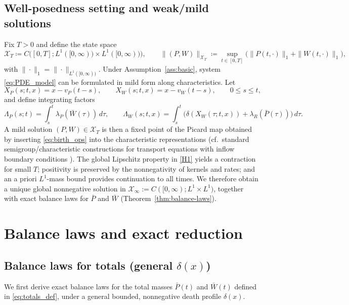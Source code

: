 \documentclass[pdflatex,sn-mathphys-ay]{sn-jnl}
\theoremstyle{thmstyleone}
\theoremstyle{definition}
\theoremstyle{remark}
\begin{document}
\subsection{Well-posedness setting and weak/mild solutions}
\label{subsec:wellposedness_setting}
Fix $T>0$ and define the state space
\begin{equation}\label{eq:XT_def}
\mathcal X_T \coloneqq C\!\big([0,T];L^1([0,\infty))\times L^1([0,\infty))\big),
\qquad
\|(P,W)\|_{\mathcal X_T} \coloneqq \sup_{t\in[0,T]}\big(\|P(t,\cdot)\|_1+\|W(t,\cdot)\|_1\big),
\end{equation}
with $\|\cdot\|_1=\|\cdot\|_{L^1([0,\infty))}$. Under Assumption~\ref{ass:basic},
system \eqref{eq:PDE_model} can be formulated in mild form along characteristics. Let
\[
X_P(s;t,x)=x-v_P(t-s),\qquad
X_W(s;t,x)=x-v_W(t-s),\qquad 0\le s\le t,
\]
and define integrating factors
\[
\Lambda_P(s;t)=\int_s^t \lambda_P(\bar W(\tau))\,d\tau,\qquad
\Lambda_W(s;t,x)=\int_s^t\big(\delta(X_W(\tau;t,x))+\lambda_R(\bar P(\tau))\big)\,d\tau.
\]
A mild solution $(P,W)\in\mathcal X_T$ is then a fixed point of the Picard map obtained by inserting
\eqref{eq:birth_ops} into the characteristic representations (cf.\ standard semigroup/characteristic
constructions for transport equations with inflow boundary conditions \citep{perthame_introduction_2023}).
The global Lipschitz property in \ref{H1} yields a contraction for small $T$; positivity is preserved by the nonnegativity of kernels and rates; and an a priori $L^1$-mass bound provides continuation to all times.
We therefore obtain a unique global nonnegative solution in
$\mathcal X_\infty := C([0,\infty);L^1\times L^1)$, together with exact balance laws for
$\bar P$ and $\bar W$ (Theorem~\ref{thm:balance-laws}).


\section{Balance laws and exact reduction}
\label{sec:balance_reduction}

\subsection{Balance laws for totals (general \texorpdfstring{$\delta(x)$}{delta(x)})}
\label{subsec:balance_general_delta}
We first derive exact balance laws for the total masses $\bar P(t)$ and $\bar W(t)$ defined in
\eqref{eq:totals_def}, under a general bounded, nonnegative death profile $\delta(x)$.
\end{document}
